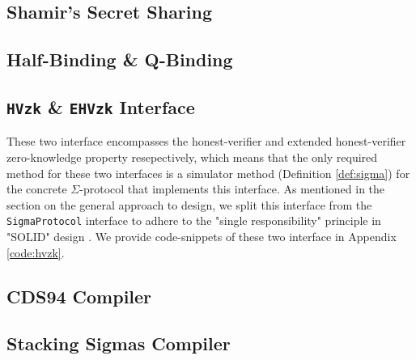\subsection{Shamir's Secret Sharing}\label{design:sss}


\subsection{Half-Binding \& Q-Binding}\label{design:qbinding}


\subsection{\texttt{HVzk} \& \texttt{EHVzk} Interface}
These two interface encompasses the honest-verifier and extended honest-verifier zero-knowledge 
property resepectively, which means that the only required method for these two interfaces 
is a simulator method (Definition \ref{def:sigma}) for the concrete $\Sigma$-protocol that 
implements this interface. As mentioned in the section on the general approach to design, 
we split this interface from the \texttt{SigmaProtocol} interface to adhere to the 
"single responsibility" principle in "SOLID" design \cite{martin2000design}. We provide 
code-snippets of these two interface in Appendix \ref{code:hvzk}.

\subsection{CDS94 Compiler}\label{design:cds94}

\subsection{Stacking Sigmas Compiler}\label{design:stacking}








